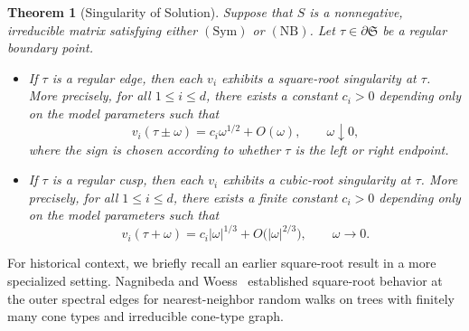 \documentclass[11pt,twoside, a4paper]{article}
\numberwithin{equation}{section}
\numberwithin{figure}{section}
\theoremstyle{plain} %
\newtheorem{theorem}{Theorem}[section]
\theoremstyle{definition}
\theoremstyle{remark}
\newcommand{\1} {\mspace{1 mu}}
\newcommand{\2} {\mspace{2 mu}}
\begin{document}
\begin{theorem}[Singularity of Solution]\label{thm:singularities}
    Suppose that \(S\) is a nonnegative, irreducible matrix satisfying either \(\mathrm{(Sym)}\) or \(\mathrm{(NB)}\). Let \(\tau\in\partial\mathfrak S\) be a regular boundary point.
    \begin{itemize}
        \item If \(\tau\) is a regular edge, then each \(v_i\) exhibits a square-root singularity at \(\tau\). More precisely, for all \(1\le i\le d\), there exists a constant \(c_i>0\) depending only on the model parameters such that
        \begin{equation}
        \label{edge singularity}
        v_i(\tau\pm\omega)
        =
        c_i\omega^{1/2}
        +
        O(\omega),
        \qquad
        \omega\downarrow 0,
        \end{equation}
        where the sign is chosen according to whether \(\tau\) is the left or right endpoint.


        \item If \(\tau\) is a regular cusp, then each \(v_i\) exhibits a cubic-root singularity at \(\tau\). More precisely, for all $1\le i\le d$, there exists a finite constant \(c_i>0\) depending only on the model parameters such that
        \begin{equation}\label{cusp singularity}
        v_i(\tau+\omega)
        =
        c_i|\omega|^{1/3}
        +
        O\bigl(|\omega|^{2/3}\bigr),
        \qquad
        \omega\to 0.
        \end{equation}
    \end{itemize}
\end{theorem}

For historical context, we briefly recall an earlier square-root result in
a more specialized setting. Nagnibeda and Woess~\cite{random2002nagnibeda}
established square-root behavior at the outer spectral edges for
nearest-neighbor random walks on trees with finitely many cone types and
irreducible cone-type graph.
\end{document}
